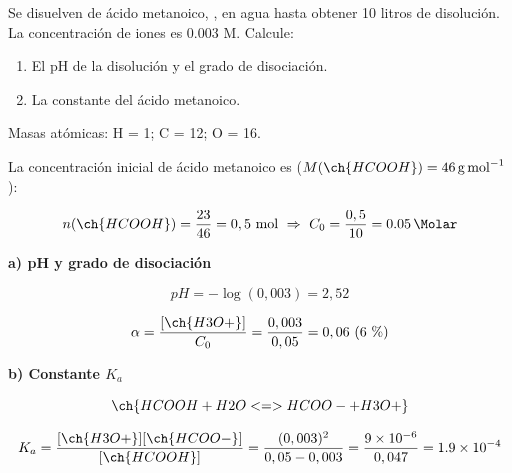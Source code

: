 \begin{exerciseEVAU}
    Se disuelven  de ácido metanoico, , en agua hasta obtener 10 litros de disolución.
    La concentración de iones  es \num{0,003} M. Calcule:

    \begin{enumerate}[label=\letraminuscula]
        \item El pH de la disolución y el grado de disociación.
        \item La constante \Ka{} del ácido metanoico.
    \end{enumerate}

    Masas atómicas: H = 1; C = 12; O = 16.

    \begin{solu}

        La concentración inicial de ácido metanoico es (\(M(\ch{HCOOH}) = \SI{46}{\gram\per\mole}\)):

        \begin{equation*}
            n(\ch{HCOOH}) = \dfrac{23}{46} = 0,5 \ \text{mol} \ \Rightarrow \ C_0 = \dfrac{0,5}{10} = \SI{0.05}{\Molar}
        \end{equation*}

        \textbf{a) pH y grado de disociación}

        \begin{equation*}
            pH = -\log(0,003) = 2,52
        \end{equation*}

        \begin{equation*}
            \alpha = \dfrac{[\ch{H3O+}]}{C_0} = \dfrac{0,003}{0,05} = 0,06 \ (6\ \%)
        \end{equation*}

        \textbf{b) Constante \(K_a\)}

        \begin{equation*}
            \ch{HCOOH + H2O <=> HCOO- + H3O+}
        \end{equation*}

        \begin{equation*}
            K_a = \dfrac{[\ch{H3O+}][\ch{HCOO-}]}{[\ch{HCOOH}]} = \dfrac{(0,003)^2}{0,05-0,003} = \dfrac{9\times10^{-6}}{0,047} = \num{1.9e-4}
        \end{equation*}

    \end{solu}
\end{exerciseEVAU}


